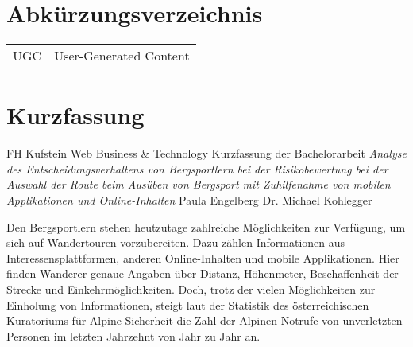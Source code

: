 
\chapter*{Abkürzungsverzeichnis}
\begin{table}[h]
	\label{my-label}
	\begin{tabular}{ll}
		UGC & User-Generated Content \\
	
	\end{tabular}
\end{table}

\chapter*{Kurzfassung}

FH Kufstein\newline
Web Business \& Technology\newline
Kurzfassung der Bachelorarbeit \textit{Analyse des Entscheidungsverhaltens von Bergsportlern bei der Risikobewertung bei der Auswahl der Route beim Ausüben von Bergsport mit Zuhilfenahme von mobilen Applikationen und Online-Inhalten}\newline
Paula Engelberg\newline
Dr. Michael Kohlegger


Den Bergsportlern stehen heutzutage zahlreiche Möglichkeiten zur Verfügung, um sich auf Wandertouren vorzubereiten. Dazu zählen Informationen  aus Interessensplattformen, anderen Online-Inhalten und mobile Applikationen. Hier finden Wanderer genaue Angaben über Distanz, Höhenmeter, Beschaffenheit der Strecke und Einkehrmöglichkeiten. Doch, trotz der vielen Möglichkeiten zur Einholung von Informationen, steigt laut der Statistik des österreichischen Kuratoriums für Alpine Sicherheit die Zahl der Alpinen Notrufe von unverletzten Personen im letzten Jahrzehnt von Jahr zu Jahr an.


